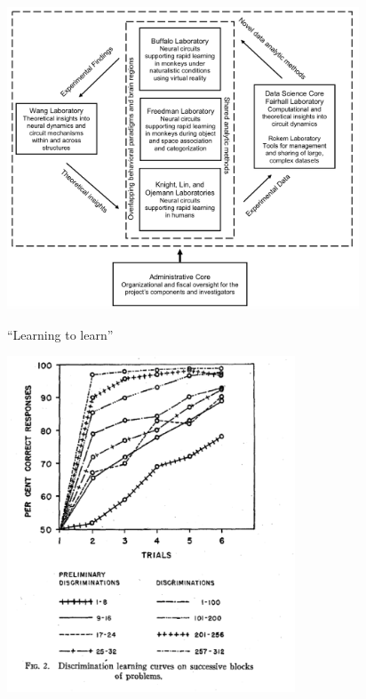 \documentclass[a0, landscape]{a0poster}
\begin{document}
\begin{multicols}{3}
\begin{minipage}[b]{1\linewidth}
\hfill
\begin{minipage}[]{0.3\linewidth}
\includegraphics[height=9cm]{u19-collaboration.png}
\end{minipage}
\hfill
\begin{minipage}[]{0.3\linewidth}
\begin{flushleft}
``Learning to learn''\cite{ Harlow1949-bd}
\end{flushleft}
\includegraphics[height=10cm]{harlow49.png}
\end{minipage}
\hfill
\begin{minipage}[]{0.3\linewidth}

\end{minipage}
\end{minipage}
\end{multicols}
\end{document}
